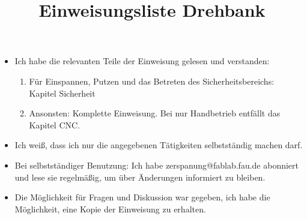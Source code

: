 \documentclass[landscape]{\basedir/fablab-document}
\title{Einweisungsliste Drehbank}
\def\tabularnewcol{&\xspace} %
\begin{document}
\setlength{\itemsep}{0em}
\begin{itemize}
\item Ich habe die relevanten Teile der Einweisung gelesen und verstanden:
	\begin{enumerate}
	\item Für Einspannen, Putzen und das Betreten des Sicherheitsbereichs:  Kapitel Sicherheit
	\item Ansonsten: Komplette Einweisung. Bei nur Handbetrieb entfällt das Kapitel CNC.
	\end{enumerate}
\item Ich weiß, dass ich nur die angegebenen Tätigkeiten selbstständig machen darf.
\item Bei selbstständiger Benutzung: Ich habe zerspanung@fablab.fau.de abonniert und lese sie regelmäßig, um über Änderungen informiert zu bleiben.
\item Die Möglichkeit für Fragen und Diskussion war gegeben, ich habe die Möglichkeit, eine Kopie der Einweisung zu erhalten.
\end{itemize}

\newcommand{\quer}[1]{\rotatebox{90}{\textbf{#1}\hspace{1em}}}


\setcounter{i}{1}

\newcommand{\leerezeile}{\hspace{2em} \tabularnewcol\parbox[b]{2cm}{Datum:\\[2em]gültig bis:} \tabularnewcol \parbox{5cm}{Name:\\[2em]Einweisender:\\[2em]} \tabularnewcol  \tabularnewcol\tabularnewcol  \tabularnewcol   \tabularnewline \hline}
\end{document}

